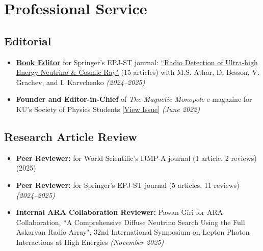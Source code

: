 \documentclass[10pt]{report}
\begin{document}
\section*{Professional Service}
\subsection*{Editorial}
\begin{itemize}
    \item \hyperlink{appendixpage}{\bfseries Book Editor} for Springer's EPJ-ST journal: \href{https://link.springer.com/collections/ediiddhcdc}{``Radio Detection of Ultra-high Energy Neutrino \& Cosmic Ray"} (15 articles) with M.S. Athar, D. Besson, V. Grachev, and I. Karvchenko  \textit{(2024--2025)}

    \vspace{0.1em}
    \noindent  
    \item {\bf Founder and Editor-in-Chief} of \textit{The Magnetic Monopole} e-magazine for KU's Society of Physics Students    \href{https://drive.google.com/file/d/12yfhWqUupWIPWM5WcWdIviUYbVA2GnWY/view?usp=sharing}{[View Issue]}  \textit{(June 2022)}
\end{itemize}

\subsection*{Research Article Review}
\begin{itemize}

    \item {\bf Peer Reviewer:} for World Scientific's IJMP-A journal (1 article, 2 reviews) (2025)

    \vspace{0.0em}
    \noindent  
    \item {\bf Peer Reviewer:} for Springer's EPJ-ST journal (5 articles, 11 reviews) \textit{(2024--2025)}

    \vspace{0.0em}
    \noindent  
    \item {\bf Internal ARA Collaboration Reviewer:} Pawan Giri for ARA Collaboration, ``A Comprehensive Diffuse Neutrino Search Using the Full Askaryan Radio Array", 32nd International Symposium on Lepton Photon Interactions at High Energies \textit{(November 2025)}

\end{itemize}
\end{document}
